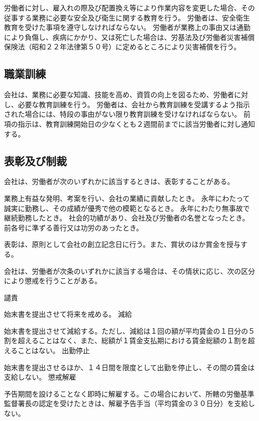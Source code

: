 \documentclass[10pt,a4paper]{jsarticle}
\begin{document}
労働者に対し、雇入れの際及び配置換え等により作業内容を変更した場合、その従事する業務に必要な安全及び衛生に関する教育を行う。
\term
労働者は、安全衛生教育を受けた事項を遵守しなければならない。
労働者が業務上の事由又は通勤により負傷し、疾病にかかり、又は死亡した場合は、労基法及び労働者災害補償保険法（昭和２２年法律第５０号）に定めるところにより災害補償を行う。

\subsection{職業訓練}

会社は、業務に必要な知識、技能を高め、資質の向上を図るため、労働者に対し、必要な教育訓練を行う。
\term
労働者は、会社から教育訓練を受講するよう指示された場合には、特段の事由がない限り教育訓練を受けなければならない。
\term
前項の指示は、教育訓練開始日の少なくとも２週間前までに該当労働者に対し通知する。

\subsection{表彰及び制裁}

会社は、労働者が次のいずれかに該当するときは、表彰することがある。
\begin{enumerate}
    \itm 業務上有益な発明、考案を行い、会社の業績に貢献したとき。
    \itm 永年にわたって誠実に勤務し、その成績が優秀で他の模範となるとき。
    \itm 永年にわたり無事故で継続勤務したとき。
    \itm 社会的功績があり、会社及び労働者の名誉となったとき。
    \itm 前各号に準ずる善行又は功労のあったとき。
\end{enumerate}
\term
表彰は、原則として会社の創立記念日に行う。また、賞状のほか賞金を授与する。

会社は、労働者が次条のいずれかに該当する場合は、その情状に応じ、次の区分により懲戒を行うことがある。
\begin{enumerate}
    \itm 譴責\par 始末書を提出させて将来を戒める。
    \itm 減給\par 始末書を提出させて減給する。ただし、減給は１回の額が平均賃金の１日分の５割を超えることはなく、また、総額が１賃金支払期における賃金総額の１割を超えることはない。
    \itm 出勤停止\par 始末書を提出させるほか、１４日間を限度として出勤を停止し、その間の賃金は支給しない。
    \itm 懲戒解雇\par 予告期間を設けることなく即時に解雇する。この場合において、所轄の労働基準監督署長の認定を受けたときは、解雇予告手当（平均賃金の３０日分）を支給しない。
\end{enumerate}
\end{document}
